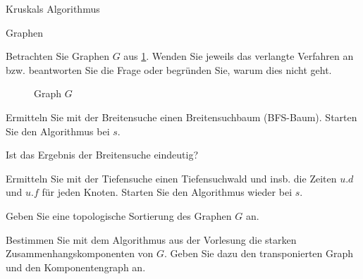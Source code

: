\documentclass{article}
\begin{document}
\begin{exercise}{Kruskals Algorithmus}
\begin{solution}
\begin{figure}[ht]
    \end{figure}
  \end{solution}
\end{exercise}

\begin{eexercises}{Graphen}{
    Betrachten Sie Graphen $G$ aus \ref{fig:simplegraph}. Wenden Sie jeweils das verlangte Verfahren an bzw. beantworten Sie die Frage oder begründen Sie, warum dies nicht geht.
    \begin{figure}[ht]
      \centering

      \caption{Graph $G$}\label{fig:simplegraph}
    \end{figure}
  }
  \item Ermitteln Sie mit der Breitensuche einen Breitensuchbaum (BFS-Baum). Starten Sie den Algorithmus bei $s$.
  \item Ist das Ergebnis der Breitensuche eindeutig?
  \item Ermitteln Sie mit der Tiefensuche einen Tiefensuchwald und insb. die Zeiten $u.d$ und $u.f$ für jeden Knoten. Starten Sie den Algorithmus wieder bei $s$.
  \item Geben Sie eine topologische Sortierung des Graphen $G$ an.
  \item Bestimmen Sie mit dem Algorithmus aus der Vorlesung die starken Zusammenhangskomponenten von $G$. Geben Sie dazu den transponierten Graph und den Komponentengraph an.
\end{eexercises}
\end{document}

